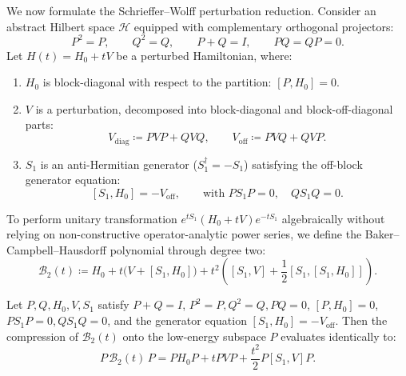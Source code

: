We now formulate the Schrieffer--Wolff perturbation reduction.
Consider an abstract Hilbert space $\mathcal{H}$ equipped with complementary orthogonal projectors:
\begin{equation}
P^2 = P, \qquad Q^2 = Q, \qquad P + Q = I, \qquad P Q = Q P = 0.
\end{equation}
Let $H(t) = H_0 + t V$ be a perturbed Hamiltonian, where:
\begin{enumerate}
    \item $H_0$ is block-diagonal with respect to the partition: $[P, H_0] = 0$.
    \item $V$ is a perturbation, decomposed into block-diagonal and block-off-diagonal parts:
    \begin{equation}
    V_{\mathrm{diag}} \coloneqq P V P + Q V Q, \qquad V_{\mathrm{off}} \coloneqq P V Q + Q V P.
    \end{equation}
    \item $S_1$ is an anti-Hermitian generator ($S_1^\dagger = -S_1$) satisfying the off-block generator equation:
    \begin{equation}
    \label{eq:generator_eq}
    [S_1, H_0] = - V_{\mathrm{off}}, \qquad \text{with } P S_1 P = 0, \quad Q S_1 Q = 0.
    \end{equation}
\end{enumerate}

To perform unitary transformation $e^{t S_1} (H_0 + t V) e^{-t S_1}$ algebraically without relying on non-constructive operator-analytic power series, we define the Baker--Campbell--Hausdorff polynomial through degree two:
\begin{equation}
\mathcal{B}_2(t) \coloneqq H_0 + t \Big( V + [S_1, H_0] \Big) + t^2 \left( [S_1, V] + \frac{1}{2} [S_1, [S_1, H_0]] \right).
\end{equation}

\begin{theorem}
\label{thm:app_sw_compressed}
Let $P, Q, H_0, V, S_1$ satisfy $P+Q=I$, $P^2=P, Q^2=Q, PQ=0$, $[P, H_0] = 0$, $P S_1 P = 0, Q S_1 Q = 0$, and the generator equation $[S_1, H_0] = -V_{\mathrm{off}}$.
Then the compression of $\mathcal{B}_2(t)$ onto the low-energy subspace $P$ evaluates identically to:
\begin{equation}
P \, \mathcal{B}_2(t) \, P = P H_0 P + t P V P + \frac{t^2}{2} P [S_1, V] P.
\end{equation}
\end{theorem}

